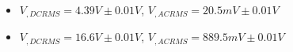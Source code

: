 \begin{itemize}
     \item $V_{, DCRMS}=4.39V\pm 0.01\unit{V}$, $V_{, ACRMS}=20.5mV\pm 0.01\unit{V}$ 
     \item $V_{, DCRMS}=16.6V\pm 0.01\unit{V}$, $V_{, ACRMS}=889.5mV\pm 0.01\unit{V}$\\
\end{itemize}